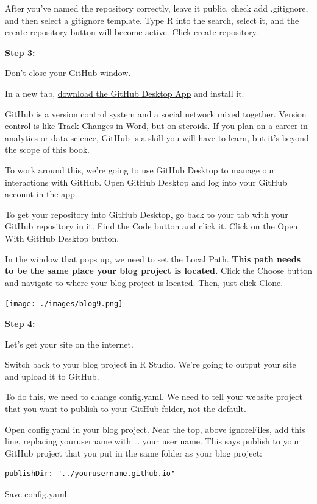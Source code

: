 \documentclass[
  letterpaper,
  DIV=11,
  numbers=noendperiod]{scrreprt}
\begin{document}
After you've named the repository correctly, leave it public, check add
.gitignore, and then select a gitignore template. Type R into the
search, select it, and the create repository button will become active.
Click create repository.

\textbf{Step 3:}

Don't close your GitHub window.

In a new tab, \href{https://desktop.github.com/}{download the GitHub
Desktop App} and install it.

GitHub is a version control system and a social network mixed together.
Version control is like Track Changes in Word, but on steroids. If you
plan on a career in analytics or data science, GitHub is a skill you
will have to learn, but it's beyond the scope of this book.

To work around this, we're going to use GitHub Desktop to manage our
interactions with GitHub. Open GitHub Desktop and log into your GitHub
account in the app.

To get your repository into GitHub Desktop, go back to your tab with
your GitHub repository in it. Find the Code button and click it. Click
on the Open With GitHub Desktop button.

In the window that pops up, we need to set the Local Path. \textbf{This
path needs to be the same place your blog project is located.} Click the
Choose button and navigate to where your blog project is located. Then,
just click Clone.

\texttt{[image: ./images/blog9.png]}

\textbf{Step 4:}

Let's get your site on the internet.

Switch back to your blog project in R Studio. We're going to output your
site and upload it to GitHub.

To do this, we need to change config.yaml. We need to tell your website
project that you want to publish to your GitHub folder, not the default.

Open config.yaml in your blog project. Near the top, above ignoreFiles,
add this line, replacing yourusername with \ldots{} your user name. This
says publish to your GitHub project that you put in the same folder as
your blog project:

\begin{verbatim}
publishDir: "../yourusername.github.io"
\end{verbatim}

Save config.yaml.
\end{document}
